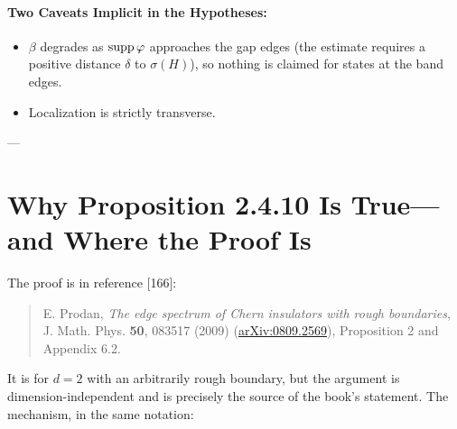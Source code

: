 \paragraph{Two Caveats Implicit in the Hypotheses:}
\begin{itemize}
    \item $\beta$ degrades as $\operatorname{supp} \varphi$ approaches the gap edges (the estimate requires a positive distance $\delta$ to $\sigma(H)$), so nothing is claimed for states at the band edges.
    \item Localization is strictly transverse.
\end{itemize}

---

\section{Why Proposition 2.4.10 Is True---and Where the Proof Is}

The proof is in reference [166]: 
\begin{quote}
    E. Prodan, \textit{The edge spectrum of Chern insulators with rough boundaries}, J. Math. Phys. \textbf{50}, 083517 (2009) (\href{https://arxiv.org/abs/0809.2569}{arXiv:0809.2569}), Proposition 2 and Appendix 6.2.
\end{quote}
It is for $d = 2$ with an arbitrarily rough boundary, but the argument is dimension-independent and is precisely the source of the book's statement. The mechanism, in the same notation:

